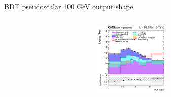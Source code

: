 \documentclass[8pt]{beamer}
\begin{document}
\begin{frame}{BDT pseudoscalar 100 GeV output shape}
\begin{columns}
\begin{column}{0.33\textwidth}
\begin{center}
			\begin{block}{}\end{block}	
     			\includegraphics[width=1.0\textwidth, height=100pt]{figs/2018/SmearSR-ttDM-pseudo100/log_cratio_topCR_ll_ST_BDT_output_pseudoscalar100_customBinsAttempt7.png}
    		\end{center}		
		\end{column}
\end{columns}


\end{frame}
\end{document}

